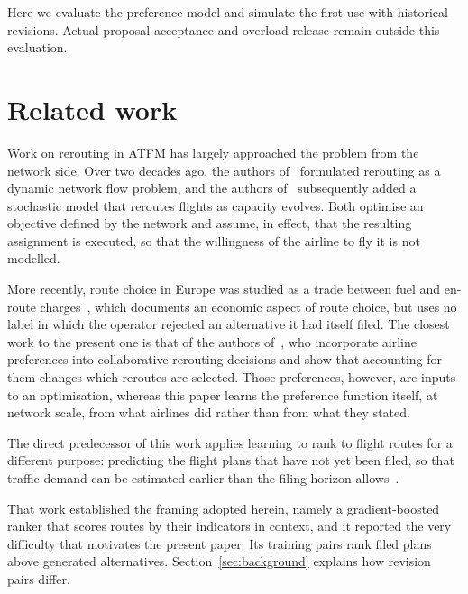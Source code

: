 \documentclass[conference,10pt,a4paper,IEEEoverridecommandlockouts]{IEEEtran}
\begin{document}
Here we evaluate the preference model and simulate the first use with
historical revisions. Actual proposal acceptance and overload release remain outside this
evaluation.

\section{Related work} \label{sec:related}

Work on rerouting in ATFM has largely approached the
problem from the network side. Over two decades ago, the authors of~\cite{bertsimas2000} formulated
rerouting as a dynamic network flow problem, and the authors
of~\cite{mukherjee2009} subsequently added a stochastic model that reroutes
flights as capacity evolves. Both optimise an objective defined by the
network and assume, in effect, that the resulting assignment is executed, so
that the willingness of the airline to fly it is not modelled.

More recently, route choice in Europe was studied as a trade between
fuel and en-route charges~\cite{delgado2015}, which documents an economic aspect of route choice, but uses no label in which the
operator rejected an alternative it had itself filed. The closest work to the present one is that of the authors
of~\cite{murca2018}, who incorporate airline preferences into collaborative
rerouting decisions and show that accounting for them changes which reroutes
are selected. Those preferences, however, are inputs to an optimisation,
whereas this paper learns the preference function itself, at network scale,
from what airlines did rather than from what they stated.

The direct predecessor of this work applies learning to rank to flight routes
for a different purpose: predicting the flight plans that have not yet been
filed, so that traffic demand can be estimated earlier than the filing horizon
allows~\cite{dalmau2024}. 

That work established the framing adopted herein, namely a gradient-boosted
ranker that scores routes by their indicators in context, and it reported
the very difficulty that motivates the present paper. Its training pairs rank filed plans above generated alternatives.
Section~\ref{sec:background} explains how revision pairs differ.
\end{document}
